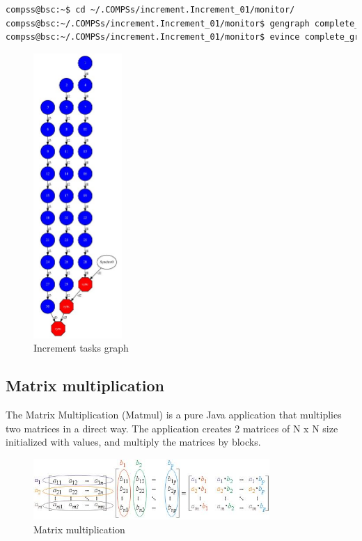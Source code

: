 \begin{lstlisting}[language=bash]
compss@bsc:~$ cd ~/.COMPSs/increment.Increment_01/monitor/
compss@bsc:~/.COMPSs/increment.Increment_01/monitor$ gengraph complete_graph.dot
compss@bsc:~/.COMPSs/increment.Increment_01/monitor$ evince complete_graph.dot.pdf
\end{lstlisting}

\begin{figure}[ht!]
  \centering
    \includegraphics[width=0.3\textwidth]{./Sections/2_Java/Figures/increment_graph.jpeg}
    \caption{Increment tasks graph} 
    \label{fig:increment}
\end{figure}

\subsection{Matrix multiplication}
The Matrix Multiplication (Matmul) is a pure Java application that multiplies two matrices in a direct way. 
The application creates 2 matrices of N x N size initialized with values, and multiply the matrices by blocks.

\begin{figure}[ht!]
  \centering
    \includegraphics[width=0.8\textwidth]{./Sections/2_Java/Figures/matrix.jpeg}
    \caption{Matrix multiplication} 
    \label{fig:matrix}
\end{figure}

